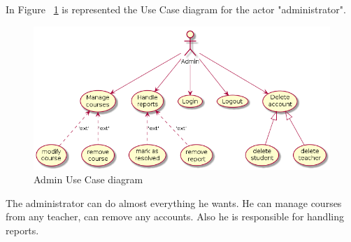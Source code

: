 \documentclass[12pt,a4paper,titlepage]{article}
\begin{document}
In Figure ~\ref{fig:admin} is represented the Use Case diagram for the actor "administrator".
\begin{figure}[H]
\centering
\includegraphics[width=\textwidth]{admin}
\caption{Admin Use Case diagram}
\label{fig:admin}
\end{figure}

The administrator can do almost everything he wants. He can manage courses from any teacher, can remove any accounts. Also he is responsible for handling reports.
\end{document}
